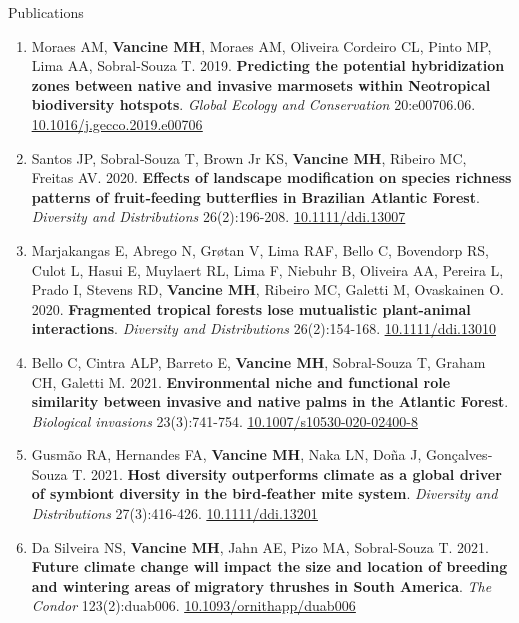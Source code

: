 \documentclass{resume}
\begin{document}
\begin{rSection}{Publications}
\begin{enumerate}
\item Moraes AM, {\bf Vancine MH}, Moraes AM, Oliveira Cordeiro CL, Pinto MP, Lima AA, Sobral-Souza T. 2019. {\bf Predicting the potential hybridization zones between native and invasive marmosets within Neotropical biodiversity hotspots}. {\it Global Ecology and Conservation} 20:e00706.06. \href{https://doi.org/10.1016/j.gecco.2019.e00706}{\underline{10.1016/j.gecco.2019.e00706}}

\item Santos JP, Sobral‐Souza T, Brown Jr KS, {\bf Vancine MH}, Ribeiro MC, Freitas AV. 2020. {\bf Effects of landscape modification on species richness patterns of fruit‐feeding butterflies in Brazilian Atlantic Forest}. {\it Diversity and Distributions} 26(2):196-208. \href{https://doi.org/10.1111/ddi.13007}{\underline{10.1111/ddi.13007}}

\item Marjakangas E, Abrego N, Grøtan V, Lima RAF, Bello C, Bovendorp RS, Culot L, Hasui E, Muylaert RL, Lima F, Niebuhr B, Oliveira AA, Pereira L, Prado I, Stevens RD, {\bf Vancine MH}, Ribeiro MC, Galetti M, Ovaskainen O. 2020. {\bf Fragmented tropical forests lose mutualistic plant-animal interactions}. {\it Diversity and Distributions} 26(2):154-168. \href{https://doi.org/10.1111/ddi.13010}{\underline{10.1111/ddi.13010}}

\item Bello C, Cintra ALP, Barreto E, {\bf Vancine MH}, Sobral-Souza T, Graham CH, Galetti M. 2021. {\bf Environmental niche and functional role similarity between invasive and native palms in the Atlantic Forest}. {\it Biological invasions} 23(3):741-754. \href{https://doi.org/10.1007/s10530-020-02400-8}{\underline{10.1007/s10530-020-02400-8}}

\item Gusmão RA, Hernandes FA, {\bf Vancine MH}, Naka LN, Doña J, Gonçalves‐Souza T. 2021. {\bf Host diversity outperforms climate as a global driver of symbiont diversity in the bird‐feather mite system}. {\it Diversity and Distributions} 27(3):416-426. \href{https://doi.org/10.1111/ddi.13201}{\underline{10.1111/ddi.13201}}

\item Da Silveira NS, {\bf Vancine MH}, Jahn AE, Pizo MA, Sobral-Souza T. 2021. {\bf Future climate change will impact the size and location of breeding and wintering areas of migratory thrushes in South America}. {\it The Condor} 123(2):duab006. \href{https://doi.org/10.1093/ornithapp/duab006}{\underline{10.1093/ornithapp/duab006}}


\end{enumerate}
\end{rSection}
\end{document}
